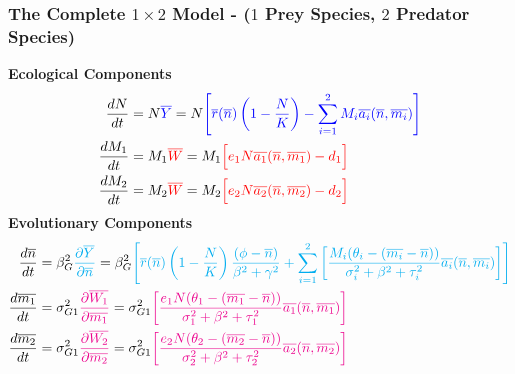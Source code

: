 \documentclass[10pt]{beamer}
\begin{document}
\begin{frame}
	\frametitle{The Complete $1\times 2$ Model - \normalsize($1$ Prey Species, $2$ Predator Species)}
	{\bf Ecological Components}
	{\footnotesize\begin{align*}
		\frac{dN}{dt} &= N{\color{blue}\overline{Y}} = N {\color{blue}\left[{\color{blue}\overline{r}(\overline{n})\left(1 - \frac{N}{K}\right) - \sum\limits_{i=1}^2M_i\overline{a_i}(\overline{n}, \overline{m_i})}\right]} \\
		\frac{dM_1}{dt} &= M_1{\color{red}\overline{W}} = M_1 {\color{red}\Big[e_{1}N\overline{a_1}(\overline{n}, \overline{m_1}) - d_1\Big]} \\
		\frac{dM_2}{dt} &= M_2{\color{red}\overline{W}} = M_2 {\color{red}\Big[e_{2}N\overline{a_2}(\overline{n}, \overline{m_2}) - d_2\Big]}
	\end{align*}}%
	{\bf Evolutionary Components}
	{\footnotesize\begin{align*}
		\frac{d\overline{n}}{dt} &= \beta_{G}^2{\color{cyan}\frac{\partial \overline{Y}}{\partial \overline{n}}} = \beta_{G}^2{\color{cyan}\left[\overline{r}(\overline{n})\left(1 - \frac{N}{K}\right)\frac{(\phi - \overline{n})}{\beta^2 + \gamma^2} + \sum\limits_{i=1}^{2}\left[\frac{M_i(\theta_{i} - (\overline{m_i} - \overline{n}))}{\sigma_i^2 + \beta^2 + \tau_{i}^2} \overline{a_{i}}(\overline{n}, \overline{m_i})\right]\right]}\\
		\frac{d\overline{m_1}}{dt} &= \sigma_{G1}^2{\color{magenta}\frac{\partial\overline{W_1}}{\partial\overline{m_1}}} = \sigma_{G1}^2{\color{magenta}\left[\frac{e_{1}N(\theta_{1} - (\overline{m_1} - \overline{n}))}{\sigma_1^2 + \beta^2 + \tau_{1}^2} \overline{a_1}(\overline{n}, \overline{m_1})\right]} \\
		\frac{d\overline{m_2}}{dt} &= \sigma_{G1}^2{\color{magenta}\frac{\partial\overline{W_2}}{\partial\overline{m_2}}} = \sigma_{G1}^2{\color{magenta}\left[\frac{e_{2}N(\theta_{2} - (\overline{m_2} - \overline{n}))}{\sigma_2^2 + \beta^2 + \tau_{2}^2} \overline{a_2}(\overline{n}, \overline{m_2})\right]}
	\end{align*}}%
\end{frame}
\end{document}
